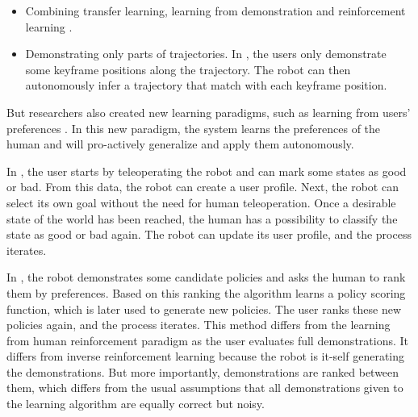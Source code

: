 \begin{itemize}
\item Combining transfer learning, learning from demonstration and reinforcement learning \cite{taylor2011integrating}.

\item Demonstrating only parts of trajectories. In \cite{akgun12hri}, the users only demonstrate some keyframe positions along the trajectory. The robot can then autonomously infer a trajectory that match with each keyframe position.

\end{itemize}

But researchers also created new learning paradigms, such as learning from users' preferences \cite{Mason2011,akrour2011preference}. In this new paradigm, the system learns the preferences of the human and will pro-actively generalize and apply them autonomously.

In \cite{Mason2011}, the user starts by teleoperating the robot and can mark some states as good or bad. From this data, the robot can create a user profile. Next, the robot can select its own goal without the need for human teleoperation. Once a desirable state of the world has been reached, the human has a possibility to classify the state as good or bad again. The robot can update its user profile, and the process iterates.


In \cite{akrour2011preference,akrour2012april,akrour2014programming,wilson2012bayesian}, the robot demonstrates some candidate policies and asks the human to rank them by preferences. Based on this ranking the algorithm learns a policy scoring function, which is later used to generate new policies. The user ranks these new policies again, and the process iterates. This method differs from the learning from human reinforcement paradigm as the user evaluates full demonstrations. It differs from inverse reinforcement learning because the robot is it-self generating the demonstrations. But more importantly, demonstrations are ranked between them, which differs from the usual assumptions that all demonstrations given to the learning algorithm are equally correct but noisy.



